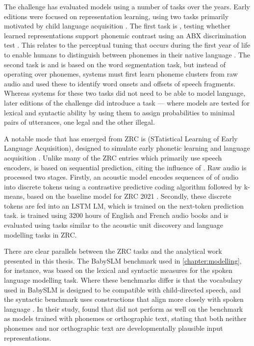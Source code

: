 
The challenge has evaluated models using a number of tasks over the years. Early editions were focused on representation learning, using two tasks primarily motivated by child language acquisition \citep{versteegh2015zero, dunbar2017zero}. The first task is , testing whether learned representations support phonemic contrast using an ABX discrimination test \citep{schatz2016abx}. This relates to the perceptual tuning that occurs during the first year of life to enable humans to distinguish between phonemes in their native language \citep{werker1984cross, kuhl1991human}. The second task is  and is based on the word segmentation task, but instead of operating over phonemes, systems must first learn phoneme clusters from raw audio and used these to identify word onsets and offsets of speech fragments. Whereas systems for these two tasks did not need to be able to model language, later editions of the challenge did introduce a  task \citep{dunbar2021zero} --- where models are tested for lexical and syntactic ability by using them to assign probabilities to minimal pairs of utterances, one legal and the other illegal.

A notable mode that has emerged from ZRC is \stela (STatistical Learning of Early Language Acquisition), designed to simulate early phonetic learning and language acquisition \citep{lavechin2022can, lavechin2025simulating}. Unlike many of the ZRC entries which primarily use speech encoders, \stela is based on sequential prediction, citing the influence of \citet{elman-1990-finding}. Raw audio is processed two stages. Firstly, an acoustic model encodes sequences of  of audio into discrete tokens using a contrastive predictive coding algorithm followed by k-means, based on the baseline model for ZRC 2021 \citep{nguyen2020zero}. Secondly, these discrete tokens are fed into an LSTM LM, which is trained on the next-token prediction task. \stela is trained using 3200 hours of English and French audio books and is evaluated using tasks similar to the acoustic unit discovery and language modelling tasks in ZRC.

There are clear parallels between the ZRC tasks and the analytical work presented in this thesis. The BabySLM benchmark used in \cref{chapter:modelling}, for instance, was based on the lexical and syntactic measures for the spoken language modelling task. Where these benchmarks differ is that the vocabulary used in BabySLM is designed to be compatible with child-directed speech, and the syntactic benchmark uses constructions that align more closely with spoken language \citep{lavechin}. In their study, \citet{lavechin} found that \stela did not perform as well on the benchmark as models trained with phonemes or orthographic text, stating that both neither phonemes and nor orthographic text are developmentally plausible input representations.

